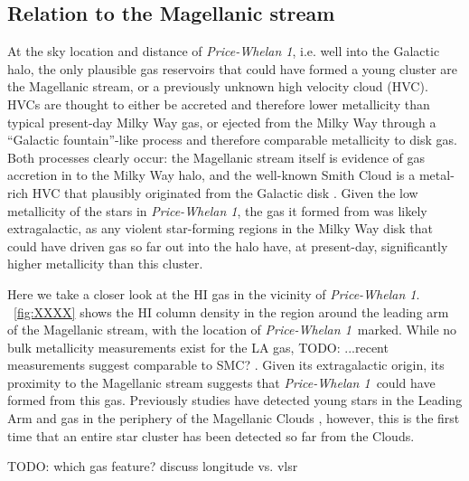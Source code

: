 \documentclass[twocolumn]{aastex62}
\newcommand{\todo}[1]{{\color{red} TODO: #1}}
\newcommand{\feh}{\ensuremath{[\textrm{Fe} / \textrm{H}]}}
\newcommand{\vlsr}{$V_{\rm LSR}~$}
\newcommand{\hi}{H{\footnotesize I} }
\newcommand{\clustername}{\textsl{Price-Whelan 1}}
\begin{document}
\subsection{Relation to the Magellanic stream}
\label{sec:higas}

At the sky location and distance of \clustername, i.e. well into the Galactic halo, the only plausible gas reservoirs that could have formed a young cluster are the Magellanic stream, or a previously unknown high velocity cloud (HVC).
HVCs are thought to either be accreted and therefore lower metallicity than typical present-day Milky Way gas, or ejected from the Milky Way through a ``Galactic fountain''-like process and therefore comparable metallicity to disk gas.
Both processes clearly occur: the Magellanic stream itself is evidence of gas accretion in to the Milky Way halo, and the well-known Smith Cloud \citep{Smith:1963} is a metal-rich \citep[$\feh \sim 0.5$[]{Fox:2016} HVC that plausibly originated from the Galactic disk \citep[e.g.,][]{Bregman:1980}.
Given the low metallicity of the stars in \clustername, the gas it formed from was likely extragalactic, as any violent star-forming regions in the Milky Way disk that could have driven gas so far out into the halo have, at present-day, significantly higher metallicity than this cluster.

Here we take a closer look at the \hi gas in the vicinity of \clustername.
\figurename~\ref{fig:XXXX} shows the \hi column density in the region around the leading arm of the Magellanic stream, with the location of \clustername\ marked.
While no bulk metallicity measurements exist for the LA gas, \todo{...recent measurements suggest comparable to SMC?} \citep{Fox:2018}.
Given its extragalactic origin, its proximity to the Magellanic stream suggests that \clustername\ could have formed from this gas.
Previously studies have detected young stars in the Leading Arm and gas in the periphery of the Magellanic Clouds \citep{Casetti-Dinescu:2014, MoniBidin:2017}, however, this is the first time that an entire star cluster has been detected so far from the Clouds.

\todo{which gas feature? discuss longitude vs. vlsr}

\end{document}
